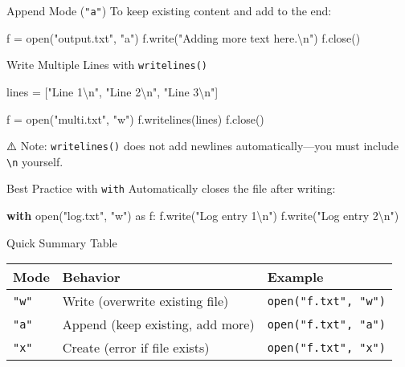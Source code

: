 \documentclass[
  letterpaper,
  DIV=11,
  numbers=noendperiod]{scrreprt}
\newenvironment{Shaded}{\begin{snugshade}}{\end{snugshade}}
\newcommand{\BuiltInTok}[1]{\textcolor[rgb]{0.00,0.23,0.31}{#1}}
\newcommand{\CharTok}[1]{\textcolor[rgb]{0.13,0.47,0.30}{#1}}
\newcommand{\ControlFlowTok}[1]{\textcolor[rgb]{0.00,0.23,0.31}{\textbf{#1}}}
\newcommand{\ImportTok}[1]{\textcolor[rgb]{0.00,0.46,0.62}{#1}}
\newcommand{\NormalTok}[1]{\textcolor[rgb]{0.00,0.23,0.31}{#1}}
\newcommand{\OperatorTok}[1]{\textcolor[rgb]{0.37,0.37,0.37}{#1}}
\newcommand{\StringTok}[1]{\textcolor[rgb]{0.13,0.47,0.30}{#1}}
\begin{document}
Append Mode (\texttt{"a"}) To keep existing content and add to the end:

\begin{Shaded}
\begin{Highlighting}[]
\NormalTok{f }\OperatorTok{=} \BuiltInTok{open}\NormalTok{(}\StringTok{"output.txt"}\NormalTok{, }\StringTok{"a"}\NormalTok{)}
\NormalTok{f.write(}\StringTok{"Adding more text here.}\CharTok{\textbackslash{}n}\StringTok{"}\NormalTok{)}
\NormalTok{f.close()}
\end{Highlighting}
\end{Shaded}

Write Multiple Lines with \texttt{writelines()}

\begin{Shaded}
\begin{Highlighting}[]
\NormalTok{lines }\OperatorTok{=}\NormalTok{ [}\StringTok{"Line 1}\CharTok{\textbackslash{}n}\StringTok{"}\NormalTok{, }\StringTok{"Line 2}\CharTok{\textbackslash{}n}\StringTok{"}\NormalTok{, }\StringTok{"Line 3}\CharTok{\textbackslash{}n}\StringTok{"}\NormalTok{]}

\NormalTok{f }\OperatorTok{=} \BuiltInTok{open}\NormalTok{(}\StringTok{"multi.txt"}\NormalTok{, }\StringTok{"w"}\NormalTok{)}
\NormalTok{f.writelines(lines)}
\NormalTok{f.close()}
\end{Highlighting}
\end{Shaded}

⚠️ Note: \texttt{writelines()} does not add newlines automatically---you
must include \texttt{\textbackslash{}n} yourself.

Best Practice with \texttt{with} Automatically closes the file after
writing:

\begin{Shaded}
\begin{Highlighting}[]
\ControlFlowTok{with} \BuiltInTok{open}\NormalTok{(}\StringTok{"log.txt"}\NormalTok{, }\StringTok{"w"}\NormalTok{) }\ImportTok{as}\NormalTok{ f:}
\NormalTok{    f.write(}\StringTok{"Log entry 1}\CharTok{\textbackslash{}n}\StringTok{"}\NormalTok{)}
\NormalTok{    f.write(}\StringTok{"Log entry 2}\CharTok{\textbackslash{}n}\StringTok{"}\NormalTok{)}
\end{Highlighting}
\end{Shaded}

Quick Summary Table

\begin{longtable}[]{@{}lll@{}}
\toprule\noalign{}
Mode & Behavior & Example \\
\midrule\noalign{}
\endhead
\bottomrule\noalign{}
\endlastfoot
\texttt{"w"} & Write (overwrite existing file) &
\texttt{open("f.txt",\ "w")} \\
\texttt{"a"} & Append (keep existing, add more) &
\texttt{open("f.txt",\ "a")} \\
\texttt{"x"} & Create (error if file exists) &
\texttt{open("f.txt",\ "x")} \\
\end{longtable}
\end{document}
